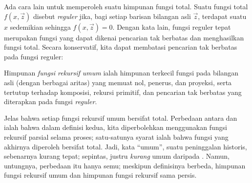 \documentclass[../../../include/open-logic-section]{subfiles}
\begin{document}

Ada cara lain untuk memperoleh suatu himpunan fungsi total. Suatu fungsi total
$f(x,\vec z)$ disebut \emph{reguler} jika, bagi setiap barisan bilangan asli
$\vec z$, terdapat suatu $x$ sedemikian sehingga $f(x,\vec z)=0$. Dengan kata
lain, fungsi reguler tepat merupakan fungsi yang dapat dikenai pencarian tak
berbatas dan menghasilkan fungsi total. Secara konservatif, kita dapat
membatasi pencarian tak berbatas pada fungsi reguler:

\begin{defn}
Himpunan \emph{fungsi rekursif umum} ialah himpunan terkecil fungsi pada
bilangan asli (dengan berbagai aritas) yang memuat nol, penerus, dan proyeksi,
serta tertutup terhadap komposisi, rekursi primitif, dan pencarian tak berbatas
yang diterapkan pada fungsi \emph{reguler}.
\end{defn}

Jelas bahwa setiap fungsi rekursif umum bersifat total. Perbedaan antara
 dan  ialah bahwa
dalam definisi kedua, kita diperbolehkan menggunakan fungsi rekursif parsial
selama proses; satu-satunya syarat ialah bahwa fungsi yang akhirnya diperoleh
bersifat total. Jadi, kata ``umum'', suatu peninggalan historis, sebenarnya
kurang tepat; sepintas,  justru \emph{kurang}
umum daripada . Namun, untungnya, perbedaan itu
hanya semu; meskipun definisinya berbeda, himpunan fungsi rekursif umum dan
himpunan fungsi rekursif sama persis.
\end{document}
